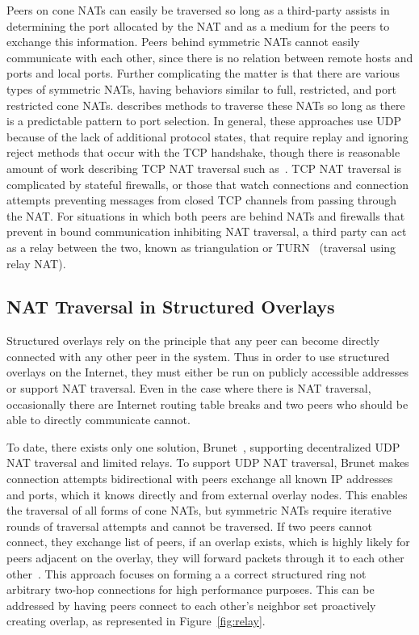 Peers on cone NATs can easily be traversed so long as a third-party assists in
determining the port allocated by the NAT and as a medium for the peers to
exchange this information.  Peers behind symmetric NATs cannot easily
communicate with each other, since there is no relation between remote hosts
and ports and local ports.  Further complicating the matter is that there are
various types of symmetric NATs, having behaviors similar to full, restricted,
and port restricted cone NATs.  \cite{ice} describes methods to traverse
these NATs so long as there is a predictable pattern to port selection.  In
general, these approaches use UDP because of the lack of additional protocol
states, that require replay and ignoring reject methods that occur with the TCP
handshake,  though there is reasonable amount of work describing TCP NAT
traversal such as~\cite{tcp_nat}.  TCP NAT traversal is complicated by stateful
firewalls, or those that watch connections and connection attempts preventing
messages from closed TCP channels from passing through the NAT.  For situations
in which both peers are behind NATs and firewalls that prevent in bound
communication inhibiting NAT traversal, a third party can act as a relay
between the two, known as triangulation or TURN~\cite{turn} (traversal using
relay NAT).

\subsection{NAT Traversal in Structured Overlays}
Structured overlays rely on the principle that any peer can become directly
connected with any other peer in the system.  Thus in order to use structured
overlays on the Internet, they must either be run on publicly accessible
addresses or support NAT traversal.  Even in the case where there is NAT
traversal, occasionally there are Internet routing table breaks and two
peers who should be able to directly communicate cannot.

To date, there exists only one solution, Brunet~\cite{brunet}, supporting
decentralized UDP NAT traversal and limited relays.  To support UDP NAT
traversal, Brunet makes connection attempts bidirectional with peers exchange
all known IP addresses and ports, which it knows directly and from external
overlay nodes.  This enables the traversal of all forms of cone NATs, but
symmetric NATs require iterative rounds of traversal attempts and cannot be
traversed.  If two peers cannot connect, they exchange list of peers, if an
overlap exists, which is highly likely for peers adjacent on the overlay, they
will forward packets through it to each other other~\cite{hpdc08_1}.  This
approach focuses on forming a a correct structured ring not arbitrary two-hop
connections for high performance purposes.  This can be addressed by having
peers connect to each other's neighbor set proactively creating overlap, as
represented in Figure~\ref{fig:relay}.

